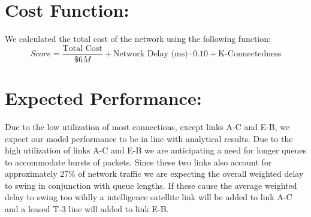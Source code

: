 \documentclass{article}
\begin{document}
\section{Cost Function:}
We calculated the total cost of the network using the following function:
\begin{equation}
Score = \frac{\text{Total Cost}}{\$6M} + \text{Network Delay (ms)} \cdot 0.10 + \text{K-Connectedness}
\end{equation}

\section{Expected Performance:}
Due to the low utilization of most connections, except links A-C and E-B, we expect our model performance to be in line with analytical results. 
Due to the high utilization of links A-C and E-B we are anticipating a need for longer queues to accommodate bursts of packets. 
Since these two links also account for approximately 27\% of network traffic we are expecting the overall weighted delay to swing in conjunction with queue lengths. 
If these cause the average weighted delay to swing too wildly a intelligence satellite link will be added to link A-C and a leased T-3 line will added to link E-B.
\end{document}
